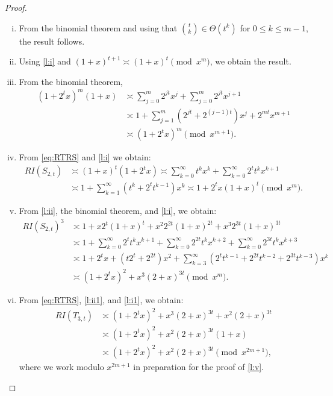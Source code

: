 \documentclass[10pt,a4paper]{amsart}
\begin{document}
\begin{proof}
\begin{enumerate}[(i)]
\item
From the binomial theorem and using that $\binom{t}{k}\in\Theta(t^k)$ for $0\leq k\leq m-1$, the result follows.

\item Using \eqref{l:i} and  $(1+x)^{t+1}\asymp (1+x)^t\pmod{x^m}$, we obtain the result.
\item From the binomial theorem,
  \begin{align*}
    (1+2^tx)^m(1+x)&\asymp \sum_{j=0}^{m}2^{jt}x^j+\sum_{j=0}^m 2^{jt}x^{j+1}\\
    & \asymp 1+\sum_{j=1}^m(2^{jt}+2^{(j-1)t})x^j+2^{mt}x^{m+1}\\
    &\asymp (1+2^tx)^m\pmod{x^{m+1}}.
  \end{align*}
\item From \eqref{eq:RTRS} and \eqref{l:i} we obtain:
  \begin{align*}
    RI(S_{2,t})&\asymp (1+x)^t(1+2^tx)\asymp \sum_{k=0}^\infty t^kx^k+\sum_{k=0}^\infty 2^t t^k x^{k+1}\\               
               &\asymp 1+\sum_{k=1}^\infty (t^k+2^t t^{k-1})x^k\asymp 1+2^tx(1+x)^t\pmod{x^m}.
  \end{align*}




\item From \eqref{l:ii}, the binomial theorem, and \eqref{l:i}, we obtain:
\begin{align*}
RI(S_{2,t})^3&\asymp 1+x2^t(1+x)^t+x^2 2^{2t}(1+x)^{2t}+x^3 2^{3t}(1+x)^{3t}\\
&\asymp 1+\sum_{k=0}^\infty 2^tt^{k}x^{k+1}+\sum_{k=0}^\infty 2^{2t}t^{k}x^{k+2}+\sum_{k=0}^\infty 2^{3t}t^{k}x^{k+3}\\   
&\asymp 1+2^tx+(t2^{t}+2^{2t})x^2+\sum_{k=3}^\infty (2^{t}t^{k-1}+2^{2t}t^{k-2}+2^{3t}t^{k-3})x^k\\
&\asymp (1+2^tx)^{2}+x^3(2+x)^{3t} \pmod{x^m}.
\end{align*}

\item From \eqref{eq:RTRS}, \eqref{l:ii1}, and \eqref{l:i1}, we obtain:
\begin{align*}
RI(T_{3,t})&\asymp (1+2^tx)^{2}+x^3(2+x)^{3t}+x^{2}(2+x)^{3t}\\
&\asymp (1+2^tx)^{2}+x^{2}(2+x)^{3t}(1+x)\\
&\asymp (1+2^tx)^{2}+x^{2}(2+x)^{3t} \pmod{x^{2m+1}},
\end{align*}
where we work modulo \(x^{2m+1}\) in preparation for the proof of \eqref{l:v}.





\end{enumerate}
\end{proof}
\end{document}
